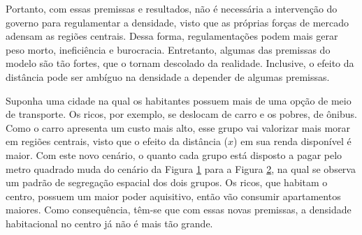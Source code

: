\begin{figure}[h]
    \centering
    \caption{Curva de preço por metro quadrado}
    \begin{subfigure}{.6\linewidth}
        
    \end{subfigure}
    \label{fig:micro}
\end{figure}

Portanto, com essas premissas e resultados, não é necessária a intervenção do governo para regulamentar a densidade, visto que as próprias forças de mercado adensam as regiões centrais. Dessa forma, regulamentações podem mais gerar peso morto, ineficiência e burocracia. Entretanto, algumas das premissas do modelo são tão fortes, que o tornam descolado da realidade. Inclusive, o efeito da distância pode ser ambíguo na densidade a depender de algumas premissas. 

Suponha uma cidade na qual os habitantes possuem mais de uma opção de meio de transporte. Os ricos, por exemplo, se deslocam de carro e os pobres, de ônibus. Como o carro apresenta um custo mais alto, esse grupo vai valorizar mais morar em regiões centrais, visto que o efeito da distância ($x$) em sua renda disponível é maior. Com este novo cenário, o quanto cada grupo está disposto a pagar pelo metro quadrado muda do cenário da Figura \ref{fig:micro} para a Figura \ref{fig:micro-2}, na qual se observa um padrão de segregação espacial dos dois grupos. Os ricos, que habitam o centro, possuem um maior poder aquisitivo, então vão consumir apartamentos maiores. Como consequência, têm-se que com essas novas premissas, a densidade habitacional no centro já não é mais tão grande.

\begin{figure}[h]
    \centering
    \caption{Curva de preço por metro quadrado com dois grupos}
    \begin{subfigure}{.6\linewidth}
        
    \end{subfigure}
    \label{fig:micro-2}
\end{figure}



